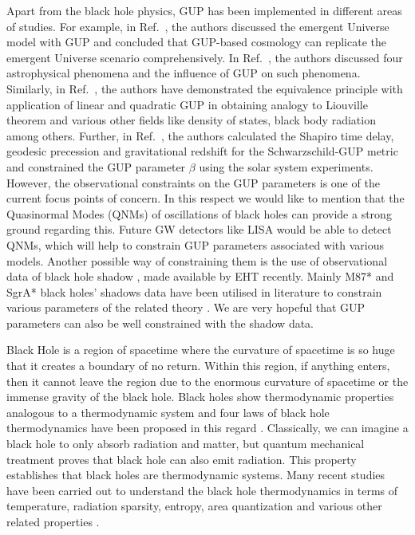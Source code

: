 \documentclass[aps,amsmath,amssymb,showpacs,showkeys]{revtex4}
\begin{document}
Apart from the black hole physics, GUP has been implemented in different
areas of studies. For example,
in Ref.\ \cite{40-3}, the authors discussed the emergent Universe 
model with GUP and concluded that GUP-based cosmology can replicate the 
emergent Universe scenario comprehensively. In Ref.\ \cite{40-4}, the authors 
discussed four astrophysical phenomena and the influence of GUP on such 
phenomena. Similarly, in Ref.\ \cite{40-8}, the authors have demonstrated the 
equivalence principle with application of linear and quadratic GUP in 
obtaining analogy to Liouville theorem and various other fields like density 
of states, black body radiation among others. Further, in Ref.\ \cite{40-9}, 
the authors calculated the Shapiro time delay, geodesic precession and 
gravitational redshift for the Schwarzschild-GUP metric and constrained the 
GUP parameter $\beta$ using the solar system experiments.
 However, the observational constraints on the GUP parameters is one of 
the current focus points of concern. In this respect we would like to mention 
that the Quasinormal Modes (QNMs) of oscillations \cite{20} of black holes can 
provide a strong ground regarding this. Future GW detectors like LISA would 
be able to detect QNMs, which will help to constrain GUP parameters associated 
with various models. Another possible way of constraining them is the use of 
observational data of black hole shadow \cite{shadow_jusufi}, made available 
by EHT recently. Mainly M87* and SgrA* black holes' shadows data have been 
utilised in literature to constrain various parameters of the related theory 
\cite{shadow_jusufi}. We are very hopeful that GUP parameters can also be well 
constrained with the shadow data.

Black Hole is a region of spacetime where the curvature of spacetime 
is so huge that it creates a boundary of no return. Within this region, 
if anything enters, then it cannot leave the region due to the enormous 
curvature of spacetime or the immense gravity of the black hole. Black holes 
show thermodynamic properties analogous to a thermodynamic system and four 
laws of black hole thermodynamics have been proposed in this regard 
\cite{22,23,24,25,26,27}. Classically, we can imagine a black hole to only 
absorb radiation and matter, but quantum mechanical treatment proves that 
black hole can also emit radiation. This property establishes that black holes 
are thermodynamic systems. Many recent studies have been carried out to 
understand the black hole thermodynamics in terms of temperature, radiation 
sparsity, entropy, area quantization and various other related properties 
\cite{28,29,30,31,32,33,35,36,37,38,39,40,41,42,dj}. 
\end{document}

